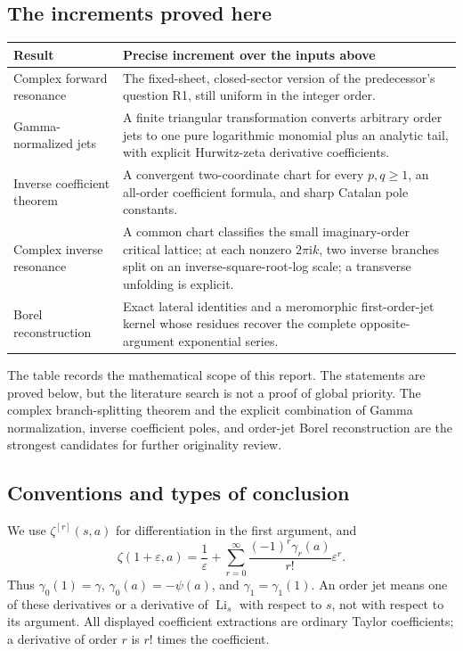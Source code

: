 \documentclass[11pt,a4paper]{article}
\numberwithin{equation}{section}
\theoremstyle{definition}
\theoremstyle{remark}
\DeclareMathOperator{\Li}{Li}
\newcommand{\ii}{\mathrm i}
\newcommand{\eps}{\varepsilon}
\begin{document}
\subsection{The increments proved here}

\begin{center}
\begin{tabular}{@{}>{\raggedright\arraybackslash}p{}>{\raggedright\arraybackslash}p{}@{}}
\toprule
Result & Precise increment over the inputs above\\
\midrule
Complex forward resonance & The fixed-sheet, closed-sector version of
the predecessor's question R1, still uniform in the integer order.\\[3pt]
Gamma-normalized jets & A finite triangular transformation converts
arbitrary order jets to one pure logarithmic monomial plus an analytic
tail, with explicit Hurwitz-zeta derivative coefficients.\\[3pt]
Inverse coefficient theorem & A convergent two-coordinate chart for every
$p,q\ge1$, an all-order coefficient formula, and sharp Catalan pole
constants.\\[3pt]
Complex inverse resonance & A common chart classifies the small imaginary-order critical lattice;
at each nonzero $2\pi\ii k$, two inverse branches split on an inverse-square-root-log
scale; a transverse unfolding is explicit.\\[3pt]
Borel reconstruction & Exact lateral identities and a meromorphic
first-order-jet kernel whose residues recover the complete opposite-
argument exponential series.\\
\bottomrule
\end{tabular}
\end{center}

The table records the mathematical scope of this report. The statements
are proved below, but the literature search is not a proof of global
priority. The complex branch-splitting theorem and the explicit
combination of Gamma normalization, inverse coefficient poles, and
order-jet Borel reconstruction are the strongest candidates for further
originality review.

\subsection{Conventions and types of conclusion}

We use $\zeta^{[r]}(s,a)$ for differentiation in the first argument, and
\begin{equation}\label{eq:stieltjes-convention}
 \zeta(1+\eps,a)=\frac1\eps+
 \sum_{r=0}^{\infty}\frac{(-1)^r\gamma_r(a)}{r!}\eps^r.
\end{equation}
Thus $\gamma_0(1)=\gamma$, $\gamma_0(a)=-\psi(a)$, and
$\gamma_1=\gamma_1(1)$. An order jet means one of these derivatives
or a derivative of $\Li_s$ with respect to $s$, not with respect to its
argument. All displayed coefficient extractions are ordinary Taylor
coefficients; a derivative of order $r$ is $r!$ times the coefficient.
\end{document}
